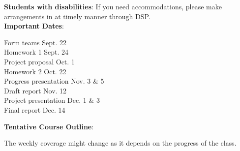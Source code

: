 \documentclass[11pt]{article}
\begin{document}
\textbf{Students with disabilities}: If you need accommodations, please make
arrangements in at timely manner through DSP.\\

\noindent\textbf{Important Dates}:
\begin{center} \begin{minipage}{5in}
\begin{flushleft}
Form teams \dotfill Sept. 22\\
Homework 1 \dotfill Sept. 24\\
Project proposal \dotfill Oct. 1\\
Homework 2 \dotfill Oct. 22\\
Progress presentation \dotfill Nov. 3 \& 5\\
Draft report \dotfill Nov. 12\\
Project presentation \dotfill Dec. 1 \& 3\\
Final report \dotfill Dec. 14\\
\end{flushleft}
\end{minipage}
\end{center}

\newpage

\textbf {\large Tentative Course Outline}:

The weekly coverage might change as it depends on the progress of the class.
\end{document}
